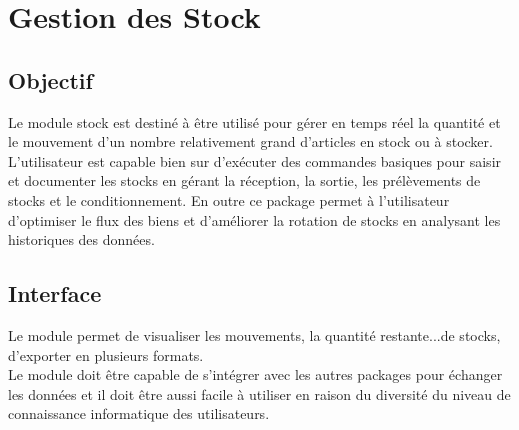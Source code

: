 \section{Gestion des Stock}
	\subsection{Objectif}
	Le module stock est destiné à être utilisé pour gérer en temps réel la quantité et le mouvement d'un nombre relativement grand d'articles en stock ou à stocker. 
	L'utilisateur est capable bien sur d'exécuter des commandes basiques pour saisir et documenter les stocks en gérant la réception, la sortie, les prélèvements de stocks et le conditionnement.
	En outre ce package permet à l'utilisateur d'optimiser le flux des biens et d'améliorer la rotation de stocks en analysant les historiques des données.\\  

	\subsection{Interface}
	Le module permet de visualiser les mouvements, la quantité restante...de stocks, d'exporter en plusieurs formats.\\
	Le module doit être capable de s'intégrer avec les autres packages pour échanger les données et il doit être aussi facile à utiliser en raison du diversité du niveau de connaissance informatique des utilisateurs.
